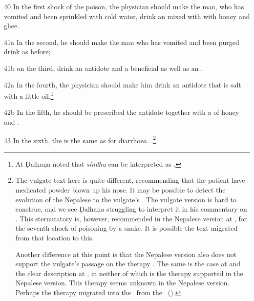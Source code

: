 \begin{translation}
    \item[40] In the first shock of the poison, the physician should make the man,
who has vomited and been sprinkled with cold water, drink an
 mixed with with honey and ghee.
    
    \item[41a] In the second, he should make the man who has vomited and been
purged drink as before;
    
    \item[41b]
    on the third, drink an antidote and a beneficial
     as well as an .
    
    
    \item[42a] In the fourth, the physician should make him drink an antidote that
is salt with a little oil.\footnote{At  Ḍalhaṇa noted that
\emph{sindhu} can be interpreted as .}
    
    

    
    \item[42b]
    In the fifth, he should be prescribed the antidote together with a
     of honey and
    .
   
   
    \item[43] In the sixth, the  is the same as for diarrhoea. %
.\footnote{The vulgate text here is quite
different, recommending that the patient have medicated powder blown up his nose.
It may be possible to detect the evolution of the Nepalese  to the
vulgate's .  The vulgate version is hard to construe, and we see
Ḍalhaṇa struggling to interpret it in his commentary on .  This
sternutatory is, however, recommended in the Nepalese version at
, for the seventh shock of poisoning by a  snake.  It is possible the text migrated from  that location to
this.

Another difference at this point is that the Nepalese version also does not
support the vulgate's passage on the  therapy
\citep[145, n.\,106]{wuja-2003}.  The same is the case at  and the
clear description at , in neither of which is the therapy
supported in the Nepalese version.  This therapy seems unknown in the Nepalese
version.  Perhaps the therapy migrated into the \SS\ from the \CS\
().}
    

\end{translation}
